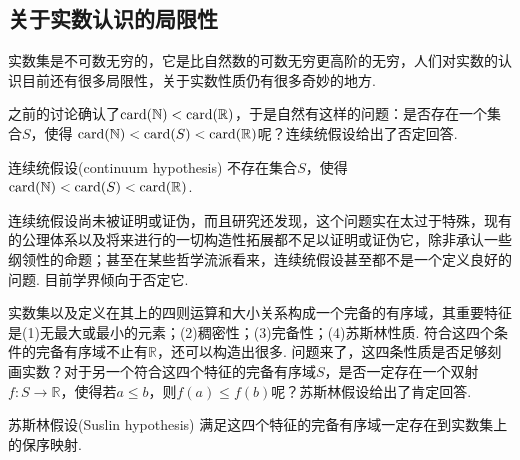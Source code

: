 



\subsection{关于实数认识的局限性}

实数集是不可数无穷的，它是比自然数的可数无穷更高阶的无穷，人们对实数的认识目前还有很多局限性，关于实数性质仍有很多奇妙的地方.

之前的讨论确认了\({\rm card}(\mathbb{N})<{\rm card}(\mathbb{R})\)，于是自然有这样的问题：是否存在一个集合\(S\)，使得 \({\rm card}(\mathbb{N}) < {\rm card}(S) < {\rm card}(\mathbb{R})\)呢？连续统假设给出了否定回答.

\begin{proposition}{连续统假设(continuum hypothesis)}
    不存在集合\(S\)，使得\({\rm card}(\mathbb{N})<{\rm card}(S)<{\rm card}(\mathbb{R})\).
\end{proposition}

连续统假设尚未被证明或证伪，而且研究还发现，这个问题实在太过于特殊，现有的公理体系以及将来进行的一切构造性拓展都不足以证明或证伪它，除非承认一些纲领性的命题；甚至在某些哲学流派看来，连续统假设甚至都不是一个定义良好的问题. 目前学界倾向于否定它.

实数集以及定义在其上的四则运算和大小关系构成一个完备的有序域，其重要特征是(1)无最大或最小的元素；(2)稠密性；(3)完备性；(4)苏斯林性质. 符合这四个条件的完备有序域不止有\(\mathbb{R}\)，还可以构造出很多. 问题来了，这四条性质是否足够刻画实数？对于另一个符合这四个特征的完备有序域\(S\)，是否一定存在一个双射\(f:S\to \mathbb{R}\)，使得若\(a\leq b\)，则\(f(a)\leq f(b)\)呢？苏斯林假设给出了肯定回答.
\begin{proposition}{苏斯林假设(Suslin hypothesis)}
    满足这四个特征的完备有序域一定存在到实数集上的保序映射.
\end{proposition}

